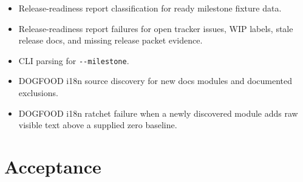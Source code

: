 \begin{itemize}
\tightlist
\item
  Release-readiness report classification for ready milestone fixture data.
\item
  Release-readiness report failures for open tracker issues, WIP labels, stale release docs, and missing release packet evidence.
\item
  CLI parsing for \texttt{-\allowbreak{}-\allowbreak{}m\allowbreak{}i\allowbreak{}l\allowbreak{}e\allowbreak{}s\allowbreak{}t\allowbreak{}o\allowbreak{}n\allowbreak{}e}.
\item
  DOGFOOD i18n source discovery for new docs modules and documented exclusions.
\item
  DOGFOOD i18n ratchet failure when a newly discovered module adds raw visible text above a supplied zero baseline.
\end{itemize}

\section{Acceptance}\label{record-214-acceptance}

